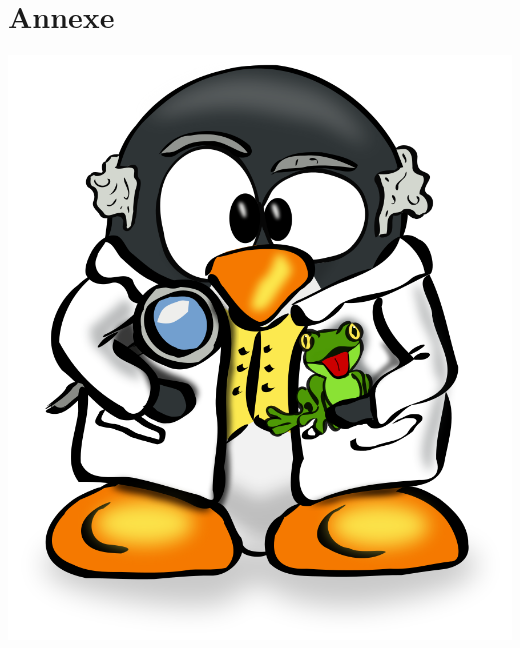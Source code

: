 \documentclass[10pt]{article}
\begin{document}
\part{Annexe}
\vspace*{\fill}
    \begin{center}
        \includegraphics[width=0.5\linewidth]{Annexe_Tux_Spallanzani.png}
    \end{center}
\vspace*{\fill}
\newpage






\newpage
{}
\end{document}
